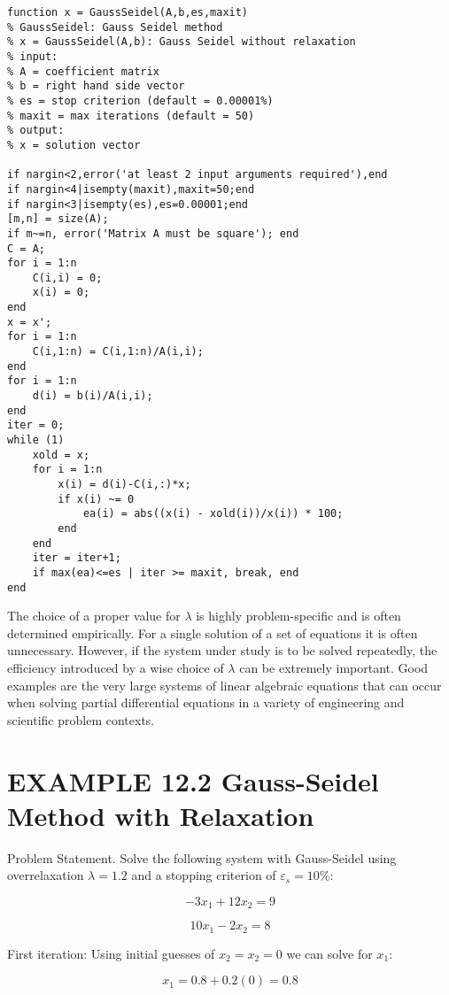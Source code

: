 \documentclass[../main.tex]{subfiles}
\begin{document}
\begin{lstlisting}[numbers=none]
function x = GaussSeidel(A,b,es,maxit)
% GaussSeidel: Gauss Seidel method
% x = GaussSeidel(A,b): Gauss Seidel without relaxation
% input:
% A = coefficient matrix
% b = right hand side vector
% es = stop criterion (default = 0.00001%)
% maxit = max iterations (default = 50)
% output:
% x = solution vector

if nargin<2,error('at least 2 input arguments required'),end
if nargin<4|isempty(maxit),maxit=50;end
if nargin<3|isempty(es),es=0.00001;end
[m,n] = size(A);
if m~=n, error('Matrix A must be square'); end
C = A;
for i = 1:n
	C(i,i) = 0;
	x(i) = 0;
end
x = x';
for i = 1:n
	C(i,1:n) = C(i,1:n)/A(i,i);
end
for i = 1:n
	d(i) = b(i)/A(i,i);
end
iter = 0;
while (1)
	xold = x;
	for i = 1:n
		x(i) = d(i)-C(i,:)*x;
		if x(i) ~= 0
			ea(i) = abs((x(i) - xold(i))/x(i)) * 100;
		end
	end
	iter = iter+1;
	if max(ea)<=es | iter >= maxit, break, end
end
\end{lstlisting}

The choice of a proper value for $\lambda$ is highly problem-specific and is often determined
empirically. For a single solution of a set of equations it is often unnecessary. However, if
the system under study is to be solved repeatedly, the efficiency introduced by a wise
choice of $\lambda$ can be extremely important. Good examples are the very large systems of linear
algebraic equations that can occur when solving partial differential equations in a variety of
engineering and scientific problem contexts.

\section*{EXAMPLE 12.2 Gauss-Seidel Method with Relaxation}


Problem Statement. Solve the following system with Gauss-Seidel using overrelaxation
$\lambda=1.2$ and a stopping criterion of $\varepsilon_{s}=10\%$:

\begin{equation}
-3x_{1}+12x_{2}=9
\end{equation}

\begin{equation}
10x_{1}-2x_{2}=8
\end{equation}

First iteration: Using initial guesses of $x_{2}=x_{2}=0$ we can solve for $x_{1}$:

\begin{equation}
x_{1}=0.8+0.2(0)=0.8
\end{equation}
\end{document}
